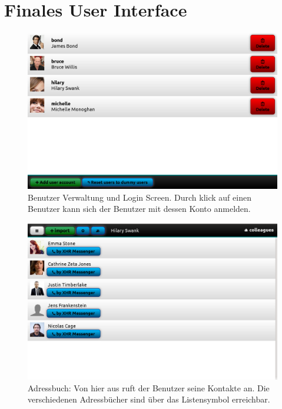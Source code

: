 \section{Finales User Interface}
	\begin{figure}[H]
		\centering
		\includegraphics[height=0.35\textheight]{../ui/img/finalUi/accountView.png}
		\caption{Benutzer Verwaltung und Login Screen. Durch klick auf einen Benutzer kann sich der Benutzer mit dessen Konto anmelden.}
		\label{login screen}
	\end{figure}
	\begin{figure}[H]
		\centering
		\includegraphics[height=0.35\textheight]{../ui/img/finalUi/contactView1.png}
		\caption{Adressbuch: Von hier aus ruft der Benutzer seine Kontakte an. Die verschiedenen Adressbücher sind über das Listensymbol erreichbar.}
		\label{contactbook screen}
	\end{figure}
